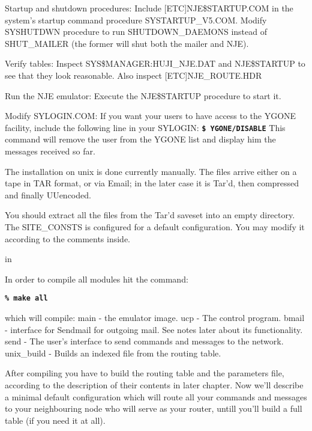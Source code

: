 {\ncrBold Startup  and  shutdown  procedures}:  Include [ETC]NJE\$STARTUP.COM
in the
system's startup command procedure  SYSTARTUP\_V5.COM.  Modify  SYSHUTDWN
procedure  to  run  SHUTDOWN\_DAEMONS  instead of SHUT\_MAILER (the former
will shut both the mailer and NJE).

{\ncrBold Verify tables}: Inspect SYS\$MANAGER:HUJI\_NJE.DAT
and NJE\$STARTUP  to  see
that they look reasonable. Also inspect [ETC]NJE\_ROUTE.HDR

{\ncrBold Run the NJE emulator:} Execute the NJE\$STARTUP procedure to start it.

{\ncrBold Modify  SYLOGIN.COM:}
If you want your users to have access to the YGONE
facility, include the following line in your SYLOGIN:
\hfill\break
{\tt\bf \$ YGONE/DISABLE}
\hfill\break
This command will remove the user from the YGONE list  and  display  him
the messages received so far.

\vfill\eject


The installation on unix is done currently manually. The files arrive
either on a tape in TAR format, or via Email; in the later  case  it  is
Tar'd, then compressed and finally UUencoded.

You should extract all the files from the Tar'd saveset into an empty
directory. The SITE\_CONSTS is configured for  a  default  configuration.
You may modify it according to the comments inside.


 in

In order to compile all modules hit the command:

{\tt\bf \% make all}

which will compile:
\hfill\break
{\ncrBold main} - the emulator image.
\hfill\break
{\ncrBold ucp} - The control program.
\hfill\break
{\ncrBold bmail} - interface for Sendmail for outgoing mail.
See notes later about its functionality.
\hfill\break
{\ncrBold send} - The user's interface to send commands and messages to the
network.
\hfill\break
{\ncrBold unix\_build} - Builds an indexed file from the routing table.

After  compiling  you have to build the routing table and the parameters
file, according to the description of their contents in  later  chapter.
Now  we'll describe a minimal default configuration which will route all
your commands and messages to your neighbouring node who will  serve  as
your router, untill you'll build a full table (if you need it at all).

